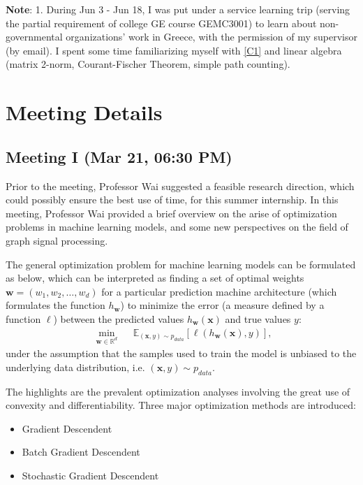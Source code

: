 \documentclass[10pt,a4paper]{article}
\begin{document}
\textbf{Note}: 1. During Jun 3 - Jun 18, I was put under a service learning trip (serving the partial requirement of college GE course GEMC3001) to learn about non-governmental organizations' work in Greece, with the permission of my supervisor (by email). I spent some time familiarizing myself with \ref{C1} and linear algebra (matrix 2-norm, Courant-Fischer Theorem, simple path counting).

\section{Meeting Details}

\subsection{Meeting I (Mar 21, 06:30 PM)} Prior to the meeting, Professor Wai suggested a feasible research direction, which could possibly ensure the best use of time, for this summer internship. In this meeting, Professor Wai provided a brief overview on the arise of optimization problems in machine learning models, and some new perspectives on the field of graph signal processing.

The general optimization problem for machine learning models can be formulated as below, which can be interpreted as finding a set of optimal weights $\mathbf{w}=(w_1, w_2, \ldots, w_d)$ for a particular prediction machine architecture (which formulates the function $h_{\mathbf{w}}$) to minimize the error (a measure defined by a function $\ell$) between the predicted values $h_{\mathbf{w}}(\mathbf{x})$ and true values $y$:
$$\begin{aligned}
           & \min\limits_{\mathbf{w}\in \mathbb{R}^d} &  & \mathbb{E}_{(\mathbf{x},y)\sim p_{data}}[\ell(h_{\mathbf{w}}(\mathbf{x}), y)],\
     \end{aligned}$$
under the assumption that the samples used to train the model is unbiased to the underlying data distribution, i.e. $(\mathbf{x}, y)\sim p_{data}$.

The highlights are the prevalent optimization analyses involving the great use of convexity and differentiability. Three major optimization methods are introduced:

\begin{itemize}
     \item Gradient Descendent
     \item Batch Gradient Descendent
     \item Stochastic Gradient Descendent
\end{itemize}
\end{document}

